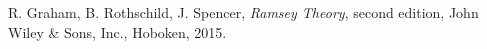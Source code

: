 \documentclass[a4paper]{amsproc}
\theoremstyle{plain}
\begin{document}
\begin{longtable}{ | l | r | r | r | }
\end{longtable}

\begin{thebibliography}{9}

  R. Graham, B. Rothschild, J. Spencer,
  \emph{Ramsey Theory}, second edition,
  John Wiley \& Sons, Inc., Hoboken,
  2015.

\end{thebibliography}
\end{document}
